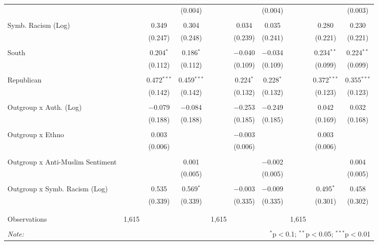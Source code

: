 \begin{table}[H]
{\begin{tabular}{@{\extracolsep{5pt}}lccccccccc}
  &  &  & (0.004) &  &  & (0.004) &  &  & (0.003) \\ 
  & & & & & & & & & \\ 
 Symb. Racism (Log) &  & 0.349 & 0.304 &  & 0.034 & 0.035 &  & 0.280 & 0.230 \\ 
  &  & (0.247) & (0.248) &  & (0.239) & (0.241) &  & (0.221) & (0.221) \\ 
  & & & & & & & & & \\ 
 South &  & 0.204$^{*}$ & 0.186$^{*}$ &  & $-$0.040 & $-$0.034 &  & 0.234$^{**}$ & 0.224$^{**}$ \\ 
  &  & (0.112) & (0.112) &  & (0.109) & (0.109) &  & (0.099) & (0.099) \\ 
  & & & & & & & & & \\ 
 Republican &  & 0.472$^{***}$ & 0.459$^{***}$ &  & 0.224$^{*}$ & 0.228$^{*}$ &  & 0.372$^{***}$ & 0.355$^{***}$ \\ 
  &  & (0.142) & (0.142) &  & (0.132) & (0.132) &  & (0.123) & (0.123) \\ 
  & & & & & & & & & \\ 
 Outgroup x Auth. (Log) &  & $-$0.079 & $-$0.084 &  & $-$0.253 & $-$0.249 &  & 0.042 & 0.032 \\ 
  &  & (0.188) & (0.188) &  & (0.185) & (0.185) &  & (0.169) & (0.168) \\ 
  & & & & & & & & & \\ 
 Outgroup x Ethno &  & 0.003 &  &  & $-$0.003 &  &  & 0.003 &  \\ 
  &  & (0.006) &  &  & (0.006) &  &  & (0.006) &  \\ 
  & & & & & & & & & \\ 
 Outgroup x Anti-Muslim Sentiment &  &  & 0.001 &  &  & $-$0.002 &  &  & 0.004 \\ 
  &  &  & (0.005) &  &  & (0.005) &  &  & (0.005) \\ 
  & & & & & & & & & \\ 
 Outgroup x Symb. Racism (Log) &  & 0.535 & 0.569$^{*}$ &  & $-$0.003 & $-$0.009 &  & 0.495$^{*}$ & 0.458 \\ 
  &  & (0.339) & (0.339) &  & (0.335) & (0.335) &  & (0.301) & (0.302) \\ 
  & & & & & & & & & \\ 
\hline \\[-1.8ex] 
Observations & 1,615 &  &  & 1,615 &  &  & 1,615 &  &  \\ 
\hline 
\hline \\[-1.8ex] 
\textit{Note:}  & \multicolumn{9}{r}{$^{*}$p$<$0.1; $^{**}$p$<$0.05; $^{***}$p$<$0.01} \\ 
\end{tabular}} 
\end{table} 
